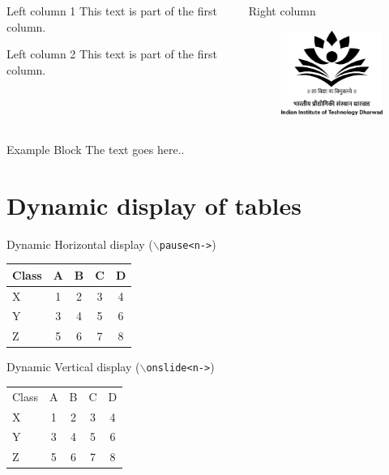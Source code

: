 \documentclass{beamer}
\begin{document}
\begin{frame}
\begin{columns}
	\begin{column}{.45\textwidth}
		\begin{alertblock}{Left column 1}
		This text is part of the first column.
		\end{alertblock}
		\begin{alertblock}{Left column 2}
		This text is part of the first column.
		\end{alertblock}
	\end{column}
		\begin{block}{Right column}
			\begin{figure}
				\centering
				\includegraphics[width=4cm]{iitdhlogo}
			\end{figure}
		\end{block}
\end{columns}
\vfill
\begin{exampleblock}{Example Block}
The text goes here.. 
\end{exampleblock}
\end{frame}

\section[Tables]{Dynamic display of tables}
\begin{frame}{Dynamic Horizontal display (\texttt{$\backslash$pause\textless n-\textgreater})}
\begin{tabular}{lcccc}
  Class & A & B & C & D \\\hline
  X     & 1 & 2 & 3 & 4 \pause\\
  Y     & 3 & 4 & 5 & 6 \pause\\
  Z     &5&6&7&8
\end{tabular}
\end{frame}

\begin{frame}{Dynamic Vertical display (\texttt{$\backslash$onslide\textless n-\textgreater})}
\begin{tabular}{lc<{\onslide<2->}c<{\onslide<3->}c<{\onslide<4->}c<{\onslide}}
Class & A & B & C & D \\
  X     & 1 & 2 & 3 & 4 \\
  Y     & 3 & 4 & 5 & 6 \\
  Z     &5&6&7&8
\end{tabular}
\end{frame}
\end{document}
